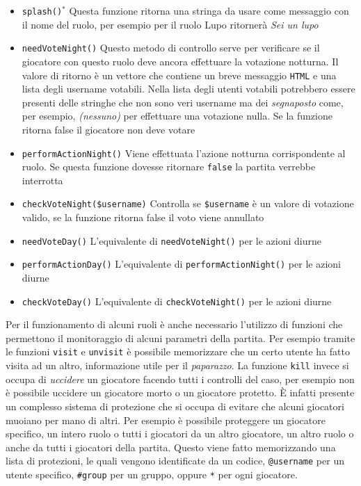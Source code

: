 \begin{itemize}[noitemsep,nolistsep]
	\item \texttt{splash()$^*$} Questa funzione ritorna una stringa da usare come messaggio con il nome del ruolo, per esempio per il ruolo Lupo ritornerà \emph{Sei un lupo}
	\item \texttt{needVoteNight()} Questo metodo di controllo serve per verificare se il giocatore con questo ruolo deve ancora effettuare la votazione notturna. Il valore di ritorno è un vettore che contiene un breve messaggio \texttt{HTML} e una lista degli username votabili. Nella lista degli utenti votabili potrebbero essere presenti delle stringhe che non sono veri username ma dei \emph{segnaposto} come, per esempio, \emph{(nessuno)} per effettuare una votazione nulla. Se la funzione ritorna false il giocatore non deve votare
	\item \texttt{performActionNight()} Viene effettuata l'azione notturna corrispondente al ruolo. Se questa funzione dovesse ritornare \texttt{false} la partita verrebbe interrotta
	\item \texttt{checkVoteNight(\$username)} Controlla se \texttt{\$username} è un valore di votazione valido, se la funzione ritorna false il voto viene annullato
	\item \texttt{needVoteDay()} L'equivalente di \texttt{needVoteNight()} per le azioni diurne
	\item \texttt{performActionDay()} L'equivalente di \texttt{performActionNight()} per le azioni diurne
	\item \texttt{checkVoteDay()} L'equivalente di \texttt{checkVoteNight()} per le azioni diurne
\end{itemize}

Per il funzionamento di alcuni ruoli è anche necessario l'utilizzo di funzioni che permettono il monitoraggio di alcuni parametri della partita. Per esempio tramite le funzioni \texttt{visit} e \texttt{unvisit} è possibile memorizzare che un certo utente ha fatto visita ad un altro, informazione utile per il \emph{paparazzo}. La funzione \texttt{kill} invece si occupa di \emph{uccidere} un giocatore facendo tutti i controlli del caso, per esempio non è possibile uccidere un giocatore morto o un giocatore protetto. È infatti presente un complesso sistema di protezione che si occupa di evitare che alcuni giocatori muoiano per mano di altri. Per esempio è possibile proteggere un giocatore specifico, un intero ruolo o tutti i giocatori da un altro giocatore, un altro ruolo o anche da tutti i giocatori della partita. Questo viene fatto memorizzando una lista di protezioni, le quali vengono identificate da un codice, \texttt{@username} per un utente specifico, \texttt{\#group} per un gruppo, oppure \texttt{*} per ogni giocatore.

